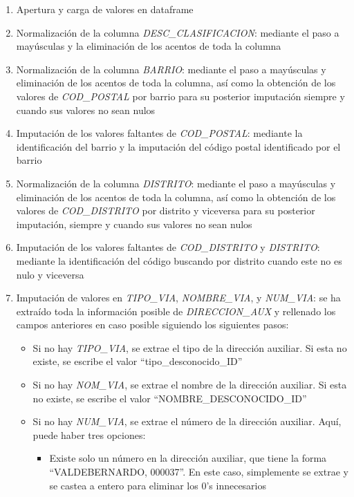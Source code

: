 \documentclass[]{article}
\begin{document}
\begin{enumerate}
    \item Apertura y carga de valores en dataframe
    \item Normalización de la columna \textit{DESC\_CLASIFICACION}: mediante el paso a mayúsculas y la eliminación de los acentos de toda la columna
    \item Normalización de la columna \textit{BARRIO}: mediante el paso a mayúsculas y eliminación de los acentos de toda la columna, así como la obtención de los valores de \textit{COD\_POSTAL} por barrio para su posterior imputación siempre y cuando sus valores no sean nulos
    \item Imputación de los valores faltantes de \textit{COD\_POSTAL}: mediante la identificación del barrio y la imputación del código postal identificado por el barrio
    \item Normalización de la columna \textit{DISTRITO}: mediante el paso a mayúsculas y eliminación de los acentos de toda la columna, así como la obtención de los valores de \textit{COD\_DISTRITO} por distrito y viceversa para su posterior imputación, siempre y cuando sus valores no sean nulos
    \item Imputación de los valores faltantes de \textit{COD\_DISTRITO} y \textit{DISTRITO}: mediante la identificación del código buscando por distrito cuando este no es nulo y viceversa
    \item Imputación de valores en \textit{TIPO\_VIA}, \textit{NOMBRE\_VIA}, y \textit{NUM\_VIA}: se ha extraído toda la información posible de \textit{DIRECCION\_AUX} y rellenado los campos anteriores en caso posible siguiendo los siguientes pasos:
    \begin{itemize}
        \item Si no hay \textit{TIPO\_VIA}, se extrae el tipo de la dirección auxiliar. Si esta no existe, se escribe el valor ``tipo\_desconocido\_ID''
        \item Si no hay \textit{NOM\_VIA}, se extrae el nombre de la dirección auxiliar. Si esta no existe, se escribe el valor ``NOMBRE\_DESCONOCIDO\_ID''
        \item Si no hay \textit{NUM\_VIA}, se extrae el número de la dirección auxiliar. Aquí, puede haber tres opciones:
        \begin{itemize}
            \item Existe solo un número en la dirección auxiliar, que tiene la forma ``VALDEBERNARDO, 000037''. En este caso, simplemente se extrae y se castea a entero para eliminar los 0's innecesarios

\end{itemize}
\end{itemize}
\end{enumerate}
\end{document}
